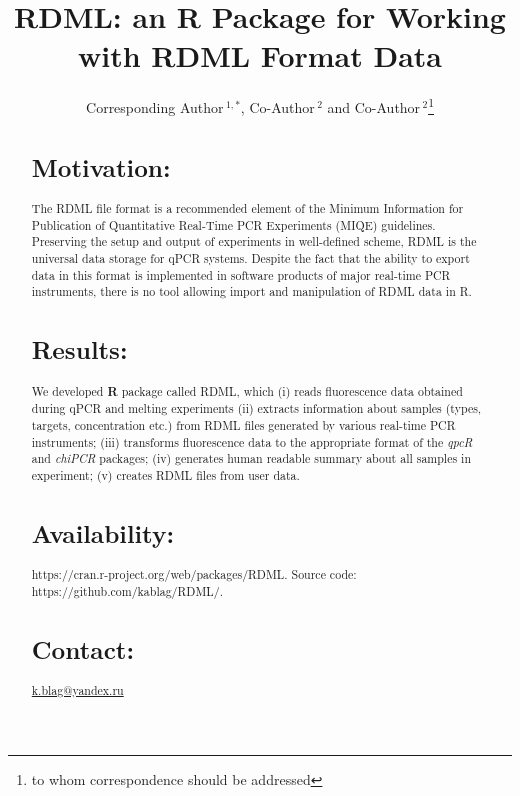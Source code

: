 \documentclass{bioinfo}
\begin{document}

\title[RDML]{RDML: an \textbf{R} Package for Working with RDML Format Data}
\author[Sample \textit{et~al}]{Corresponding Author\,$^{1,*}$, Co-Author\,$^{2}$ and Co-Author\,$^2$\footnote{to whom correspondence should be addressed}}
\address{$^{1}$Department of XXXXXXX, Address XXXX etc.\\
$^{2}$Department of XXXXXXXX, Address XXXX etc.}



\maketitle

\begin{abstract}

\section{Motivation:}
The RDML file format is a recommended element of the Minimum Information for Publication of 
Quantitative Real-Time PCR Experiments (MIQE) guidelines. Preserving the setup and 
output of experiments in well-defined scheme, RDML is the universal data storage for qPCR systems.
Despite the fact that the ability to export data in this format is implemented 
in software products of major real-time PCR instruments, there is no tool allowing import and 
manipulation of RDML data in R.

\section{Results:}
We developed \textbf{R} package called RDML, which (i) reads fluorescence data obtained 
during qPCR and melting experiments (ii) extracts information about samples 
(types, targets, concentration etc.) from RDML files generated by various real-time PCR 
instruments; (iii) transforms fluorescence data to the appropriate format of the 
\textit{qpcR} and \textit{chiPCR} packages; (iv) generates human readable 
summary about all samples in experiment; (v) creates RDML files from user data. 
\section{Availability:}
https://cran.r-project.org/web/packages/RDML. Source code:
https://github.com/kablag/RDML/.
\section{Contact:} \href{k.blag@yandex.ru}{k.blag@yandex.ru}
\end{abstract}
\end{document}
